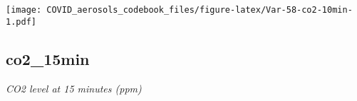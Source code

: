 \documentclass[]{article}
\begin{document}
\begin{minipage}{0.25 \textwidth}

\texttt{[image: COVID\_aerosols\_codebook\_files/figure-latex/Var-58-co2-10min-1.pdf]}

\end{minipage}

\noindent\makebox[\linewidth]{\rule{\textwidth}{0.4pt}}

\hypertarget{co2_15min}{%
\subsection{co2\_15min}\label{co2_15min}}

\emph{CO2 level at 15 minutes (ppm)}

\begin{minipage}{0.75 \textwidth}


\end{minipage}
\end{document}
